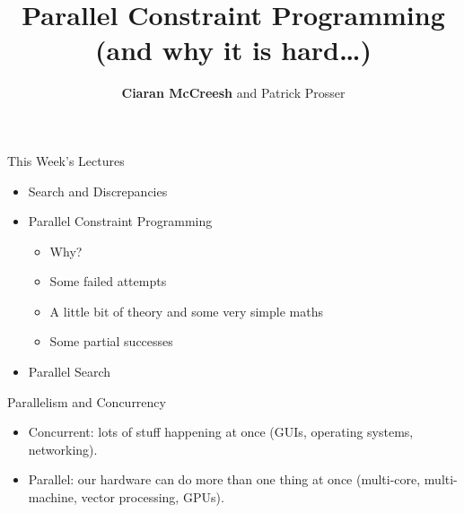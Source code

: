 \documentclass{beamer}
\title[Parallel Constraint Programming]{Parallel Constraint Programming \\ \normalfont\small (and why it is hard\ldots)}
\author[Ciaran McCreesh and Patrick Prosser]{\textbf{Ciaran McCreesh} and Patrick Prosser}
\begin{document}
{
    \begin{frame}
        \titlepage
    \end{frame}
}

\begin{frame}{This Week's Lectures}
    \begin{itemize}
        \item Search and Discrepancies
        \item \textcolor{uofgcobalt}{Parallel Constraint Programming}
        \begin{itemize}
            \item Why?
            \item Some failed attempts
            \item A little bit of theory and some very simple maths
            \item Some partial successes
        \end{itemize}
        \item Parallel Search
    \end{itemize}
\end{frame}

\begin{frame}{Parallelism and Concurrency}
    \begin{itemize}
        \item Concurrent: lots of stuff happening at once (GUIs, operating systems, networking).

        \item Parallel: our hardware can do more than one thing at once (multi-core, multi-machine,
            vector processing, GPUs).
    \end{itemize}
\end{frame}
\end{document}
